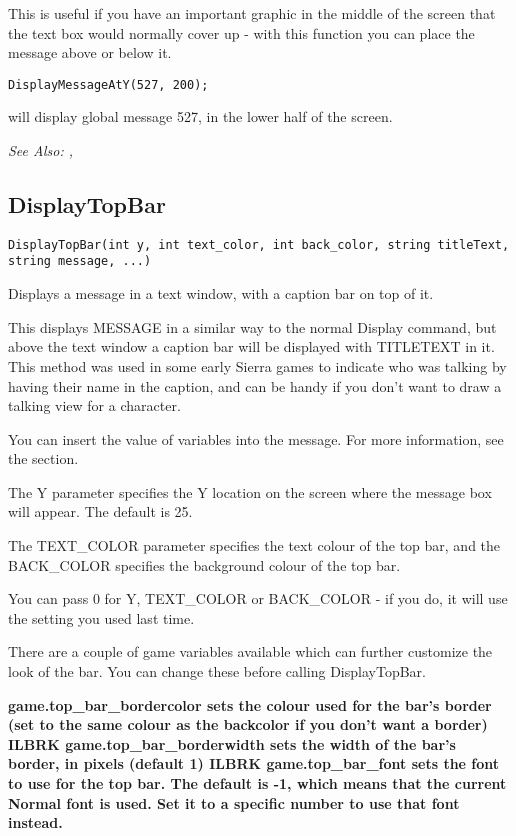 This is useful if you have an important graphic in the middle of the screen that
the text box would normally cover up - with this function you can place the message
above or below it.

\begin{verbatim}
DisplayMessageAtY(527, 200);
\end{verbatim}
will display global message 527, in the lower half of the screen.

\it{See Also:} , 



\subsection{DisplayTopBar}\label{DisplayTopBar}%

\begin{verbatim}
DisplayTopBar(int y, int text_color, int back_color, string titleText, string message, ...)
\end{verbatim}
Displays a message in a text window, with a caption bar on top of it.

This displays MESSAGE in a similar way to the normal Display command, but above the
text window a caption bar will be displayed with TITLETEXT in it. This method was
used in some early Sierra games to indicate who was talking by having their name in
the caption, and can be handy if you don't want to draw a talking view for a character.

You can insert the value of variables into the message. For more information,
see the  section.

The Y parameter specifies the Y location on the screen where the message box will appear.
The default is 25.

The TEXT_COLOR parameter specifies the text colour of the top bar, and the BACK_COLOR specifies
the background colour of the top bar.

You can pass 0 for Y, TEXT_COLOR or BACK_COLOR - if you do, it will use the setting you used
last time.

There are a couple of game variables available which can further customize the look of
the bar. You can change these before calling DisplayTopBar.

\bf{game.top_bar_bordercolor} sets the colour used for the bar's border (set to the same
colour as the backcolor if you don't want a border) ILBRK
\bf{game.top_bar_borderwidth} sets the width of the bar's border, in pixels (default 1) ILBRK
\bf{game.top_bar_font} sets the font to use for the top bar. The default is -1, which means
that the current Normal font is used. Set it to a specific number to use that font instead.


